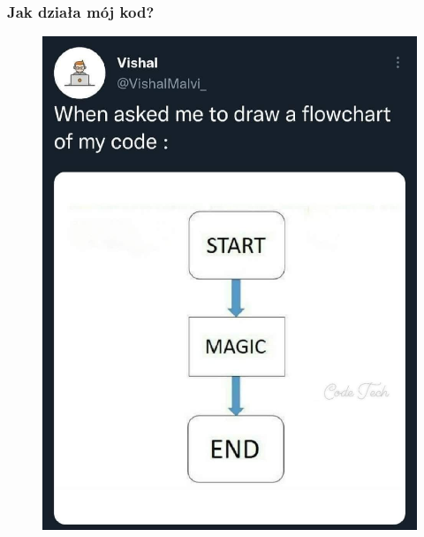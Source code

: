 \documentclass[10pt,t]{beamer}
\begin{document}
\begin{frame}
  \frametitle{Jak działa mój kod?}


  \begin{figure}

    \centering


    \includegraphics[scale=0.16]
    {./PresentationsPictures/How-my-code-work.jpg}

  \end{figure}

\end{frame}
\end{document}

